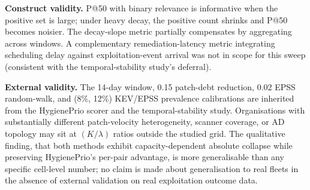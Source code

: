 \textbf{Construct validity.} P@50 with binary relevance is informative
when the positive set is large; under heavy decay, the positive count
shrinks and P@50 becomes noisier. The decay-slope metric partially
compensates by aggregating across windows. A complementary
remediation-latency metric integrating scheduling delay against
exploitation-event arrival was not in scope for this sweep
(consistent with the temporal-stability study's deferral).

\textbf{External validity.} The 14-day window, 0.15 patch-debt
reduction, 0.02 EPSS random-walk, and (8\%, 12\%) KEV/EPSS prevalence
calibrations are inherited from the HygienePrio scorer and the temporal-stability study. Organisations with
substantially different patch-velocity heterogeneity, scanner coverage,
or AD topology may sit at $(K/\lambda)$ ratios outside the studied
grid. The qualitative finding, that both methods exhibit
capacity-dependent absolute collapse while preserving HygienePrio's
per-pair advantage, is more generalisable than any specific cell-level
number; no claim is made about generalisation to real fleets in the
absence of external validation on real exploitation outcome data.
